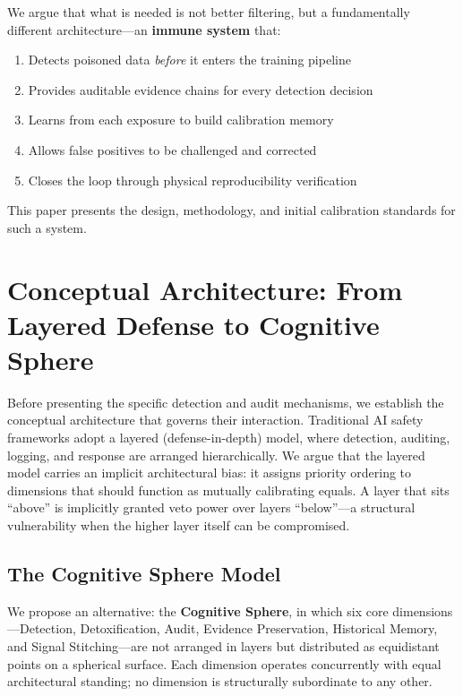 \documentclass[11pt]{article}
\begin{document}
We argue that what is needed is not better filtering, but a fundamentally different 
architecture---an \textbf{immune system} that:
\begin{enumerate}
  \item Detects poisoned data \textit{before} it enters the training pipeline
  \item Provides auditable evidence chains for every detection decision
  \item Learns from each exposure to build calibration memory
  \item Allows false positives to be challenged and corrected
  \item Closes the loop through physical reproducibility verification
\end{enumerate}

This paper presents the design, methodology, and initial calibration standards for 
such a system.

\section{Conceptual Architecture: From Layered Defense to Cognitive Sphere}
\label{sec:sphere}

Before presenting the specific detection and audit mechanisms, we establish the 
conceptual architecture that governs their interaction. Traditional AI safety 
frameworks adopt a layered (defense-in-depth) model, where detection, auditing, 
logging, and response are arranged hierarchically. We argue that the layered model 
carries an implicit architectural bias: it assigns priority ordering to dimensions 
that should function as mutually calibrating equals. A layer that sits ``above'' 
is implicitly granted veto power over layers ``below''---a structural vulnerability 
when the higher layer itself can be compromised.

\subsection{The Cognitive Sphere Model}

We propose an alternative: the \textbf{Cognitive Sphere}, in which six core 
dimensions---Detection, Detoxification, Audit, Evidence Preservation, Historical
Memory, and Signal Stitching---are not arranged in layers but distributed as
equidistant points on a spherical surface. Each dimension
operates concurrently with equal architectural standing; no dimension is
structurally subordinate to any other.
\end{document}
